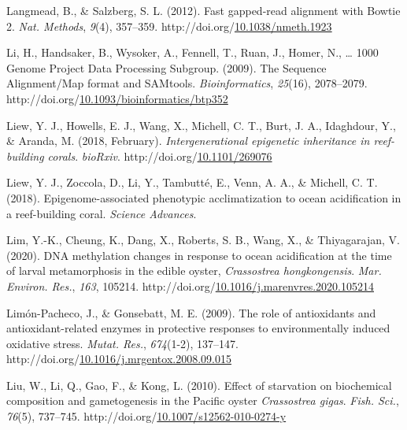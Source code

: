 \documentclass [11pt, proquest] {uwthesis}[2015/03/03]
\newlength{\cslhangindent}
\newenvironment{CSLReferences}%
{\setlength{\parindent}{0pt}%
\everypar{\setlength{\hangindent}{\cslhangindent}}\ignorespaces}%
{\par}
\begin{document}
\begin{CSLReferences}{1}{0}
\leavevmode\hypertarget{ref-Langmead2012}{}%
Langmead, B., \& Salzberg, S. L. (2012). {Fast gapped-read alignment with Bowtie 2}. \emph{Nat. Methods}, \emph{9}(4), 357--359. http://doi.org/\href{https://doi.org/10.1038/nmeth.1923}{10.1038/nmeth.1923}

\leavevmode\hypertarget{ref-Li2009}{}%
Li, H., Handsaker, B., Wysoker, A., Fennell, T., Ruan, J., Homer, N., \ldots{} 1000 Genome Project Data Processing Subgroup. (2009). {The Sequence Alignment/Map format and SAMtools}. \emph{Bioinformatics}, \emph{25}(16), 2078--2079. http://doi.org/\href{https://doi.org/10.1093/bioinformatics/btp352}{10.1093/bioinformatics/btp352}

\leavevmode\hypertarget{ref-Liew2018a}{}%
Liew, Y. J., Howells, E. J., Wang, X., Michell, C. T., Burt, J. A., Idaghdour, Y., \& Aranda, M. (2018, February). \emph{{Intergenerational epigenetic inheritance in reef-building corals}}. \emph{bioRxiv}. http://doi.org/\href{https://doi.org/10.1101/269076}{10.1101/269076}

\leavevmode\hypertarget{ref-Liew2018b}{}%
Liew, Y. J., Zoccola, D., Li, Y., Tambutté, E., Venn, A. A., \& Michell, C. T. (2018). {Epigenome-associated phenotypic acclimatization to ocean acidification in a reef-building coral}. \emph{Science Advances}.

\leavevmode\hypertarget{ref-Lim2020}{}%
Lim, Y.-K., Cheung, K., Dang, X., Roberts, S. B., Wang, X., \& Thiyagarajan, V. (2020). {DNA methylation changes in response to ocean acidification at the time of larval metamorphosis in the edible oyster, \emph{Crassostrea hongkongensis}}. \emph{Mar. Environ. Res.}, \emph{163}, 105214. http://doi.org/\href{https://doi.org/10.1016/j.marenvres.2020.105214}{10.1016/j.marenvres.2020.105214}

\leavevmode\hypertarget{ref-Limon-Pacheco2009}{}%
Limón-Pacheco, J., \& Gonsebatt, M. E. (2009). {The role of antioxidants and antioxidant-related enzymes in protective responses to environmentally induced oxidative stress}. \emph{Mutat. Res.}, \emph{674}(1-2), 137--147. http://doi.org/\href{https://doi.org/10.1016/j.mrgentox.2008.09.015}{10.1016/j.mrgentox.2008.09.015}

\leavevmode\hypertarget{ref-Liu2010}{}%
Liu, W., Li, Q., Gao, F., \& Kong, L. (2010). {Effect of starvation on biochemical composition and gametogenesis in the Pacific oyster \emph{Crassostrea gigas}}. \emph{Fish. Sci.}, \emph{76}(5), 737--745. http://doi.org/\href{https://doi.org/10.1007/s12562-010-0274-y}{10.1007/s12562-010-0274-y}


\end{CSLReferences}
\end{document}
